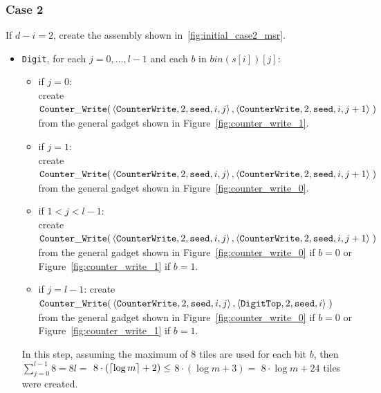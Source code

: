 \subsubsection{Case 2}
%
If $d - i = 2$, create the assembly shown in~\ref{fig:initial_case2_msr}.
%
\begin{itemize}
    \item {\tt Digit}, for each $j=0,\ldots,l-1$ and each $b$ in $bin(s[i])[j]$:
    \begin{itemize}
        \item if $j = 0$:\\ create
        $\begin{aligned}[t]
            \cwrite(&\left\langle {\tt CounterWrite}, 2, {\tt seed}, i, j \right\rangle, \left\langle {\tt CounterWrite}, 2, {\tt seed}, i, j + 1 \right\rangle \;)
        \end{aligned}$\\from the general gadget shown in Figure~\ref{fig:counter_write_1}.

        \item if $j = 1$:\\ create
        $\begin{aligned}[t]
            \cwrite(&\left\langle {\tt CounterWrite}, 2, {\tt seed}, i, j \right\rangle, \left\langle {\tt CounterWrite}, 2, {\tt seed}, i, j + 1 \right\rangle \;)
        \end{aligned}$\\from the general gadget shown in Figure~\ref{fig:counter_write_0}.

        \item if $1 < j < l-1$:\\ create
        $\begin{aligned}[t]
            \cwrite(&\left\langle {\tt CounterWrite}, 2, {\tt seed}, i, j \right\rangle, \left\langle {\tt CounterWrite}, 2, {\tt seed}, i, j + 1 \right\rangle \;)
        \end{aligned}$\\from the general gadget shown in Figure~\ref{fig:counter_write_0} if $b = 0$ or Figure~\ref{fig:counter_write_1} if $b = 1$.

        \item if $j = l-1$: create
        $\begin{aligned}[t]
            \cwrite(&\left\langle {\tt CounterWrite}, 2, {\tt seed}, i, j \right\rangle, \left\langle {\tt DigitTop}, 2, {\tt seed}, i \right\rangle \;)
        \end{aligned}$\\from the general gadget shown in Figure~\ref{fig:counter_write_0} if $b = 0$ or Figure~\ref{fig:counter_write_1} if $b = 1$.
    \end{itemize}
    In this step, assuming the maximum of 8 tiles are used for each bit $b$, then
    $\sum^{l-1}_{j=0} 8 = 8l =$
    $8 \cdot \left( \ceil*{\log m} + 2 \right) \leq$
    $8 \cdot \left( {\log m} + 3 \right) =$
    $8 \cdot {\log m} + 24$ tiles were created.


\end{itemize}
